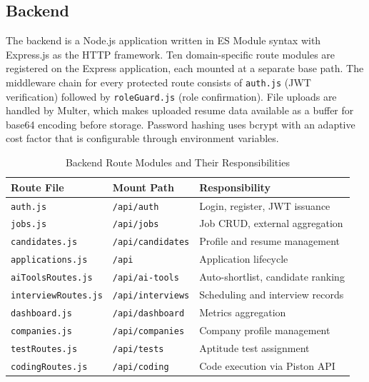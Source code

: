 \documentclass[12pt,a4paper]{report}
\begin{document}
\subsection{Backend}

The backend is a Node.js application written in ES Module syntax with Express.js as the HTTP framework. Ten domain-specific route modules are registered on the Express application, each mounted at a separate base path. The middleware chain for every protected route consists of \texttt{auth.js} (JWT verification) followed by \texttt{roleGuard.js} (role confirmation). File uploads are handled by Multer, which makes uploaded resume data available as a buffer for base64 encoding before storage. Password hashing uses bcrypt with an adaptive cost factor that is configurable through environment variables.

\begin{table}[H]
    \centering
    \caption{Backend Route Modules and Their Responsibilities}
    \label{tab:routes}
    \begin{tabular}{|l|l|p{6cm}|}
        \hline
        \textbf{Route File} & \textbf{Mount Path} & \textbf{Responsibility} \\
        \hline
        \texttt{auth.js} & \texttt{/api/auth} & Login, register, JWT issuance \\
        \texttt{jobs.js} & \texttt{/api/jobs} & Job CRUD, external aggregation \\
        \texttt{candidates.js} & \texttt{/api/candidates} & Profile and resume management \\
        \texttt{applications.js} & \texttt{/api} & Application lifecycle \\
        \texttt{aiToolsRoutes.js} & \texttt{/api/ai-tools} & Auto-shortlist, candidate ranking \\
        \texttt{interviewRoutes.js} & \texttt{/api/interviews} & Scheduling and interview records \\
        \texttt{dashboard.js} & \texttt{/api/dashboard} & Metrics aggregation \\
        \texttt{companies.js} & \texttt{/api/companies} & Company profile management \\
        \texttt{testRoutes.js} & \texttt{/api/tests} & Aptitude test assignment \\
        \texttt{codingRoutes.js} & \texttt{/api/coding} & Code execution via Piston API \\
        \hline
    \end{tabular}
\end{table}
\end{document}
